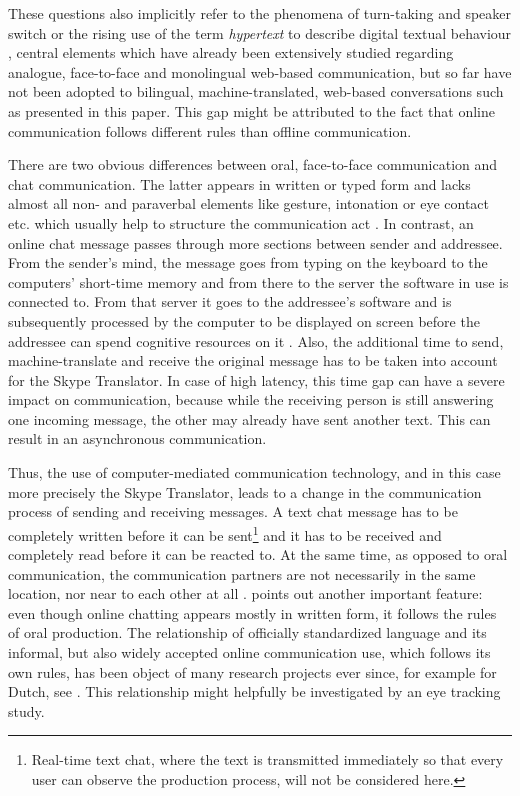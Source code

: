 \documentclass[output=paper,colorlinks,citecolor=brown]{langscibook}
\begin{document}
    These questions also implicitly refer to the phenomena of turn-taking and speaker switch or the rising use of the term \textit{hypertext} to describe digital textual behaviour \citep{storrer_sprachliche_2001}, central elements which have already been extensively studied regarding analogue, face-to-face and monolingual web-based communication, but so far have not been adopted to bilingual, machine-translated, web-based conversations such as presented in this paper. This gap might be attributed to the fact that online communication follows different rules than offline communication.
    
    There are two obvious differences between oral, face-to-face communication and chat communication. The latter appears in written or typed form and lacks almost all non- and paraverbal elements like gesture, intonation or eye contact etc. which usually help to structure the communication act \citep[172]{beiswenger_sprachhandlungskoordination_2007}. In contrast, an online chat message passes through more sections between sender and addressee. From the sender's mind, the message goes from typing on the keyboard to the computers' short-time memory and from there to the server the software in use is connected to. From that server it goes to the addressee's software and is subsequently processed by the computer to be displayed on screen before the addressee can spend cognitive resources on it \citep[146]{beisswenger_empirische_2017}. Also, the additional time to send, machine-translate and receive the original message has to be taken into account for the Skype Translator. In case of high latency, this time gap can have a severe impact on communication, because while the receiving person is still answering one incoming message, the other may already have sent another text. This can result in an asynchronous communication.
    
    Thus, the use of computer-mediated communication technology, and in this case more precisely the Skype Translator, leads to a change in the communication process of sending and receiving messages. A text chat message has to be completely written before it can be sent\footnote{Real-time text chat, where the text is transmitted immediately so that every user can observe the production process, will not be considered here.} and it has to be received and completely read before it can be reacted to. At the same time, as opposed to oral communication, the communication partners are not necessarily in the same location, nor near to each other at all \citep[146]{beisswenger_empirische_2017}. \citet[3]{storrer_sprachliche_2001} points out another important feature: even though online chatting appears mostly in written form, it follows the rules of oral production. The relationship of officially standardized language and its informal, but also widely accepted online communication use, which follows its own rules, has been object of many research projects ever since, for example for Dutch, see \citet{fiser_whatsapp_2017}. This relationship might helpfully be investigated by an eye tracking study.
    
\end{document}
